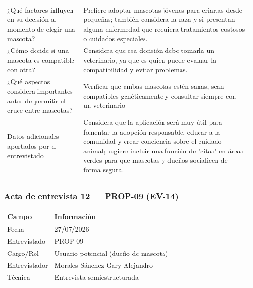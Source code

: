 \documentclass[journal,onecolumn]{IEEEtran}
\begin{document}
{\begin{longtable}{@{}p{5.6cm} p{9.4cm}@{}}
			¿Qué factores influyen en su decisión al momento de elegir una mascota? & Prefiere adoptar mascotas jóvenes para criarlas desde pequeñas; también considera la raza y si presentan alguna enfermedad que requiera tratamientos costosos o cuidados especiales. \\ \addlinespace
			
			¿Cómo decide si una mascota es compatible con otra? & Considera que esa decisión debe tomarla un veterinario, ya que es quien puede evaluar la compatibilidad y evitar problemas. \\ \addlinespace
			
			¿Qué aspectos considera importantes antes de permitir el cruce entre mascotas? & Verificar que ambas mascotas estén sanas, sean compatibles genéticamente y consultar siempre con un veterinario. \\ \addlinespace
			
			Datos adicionales aportados por el entrevistado & Considera que la aplicación será muy útil para fomentar la adopción responsable, educar a la comunidad y crear conciencia sobre el cuidado animal; sugiere incluir una función de "citas" en áreas verdes para que mascotas y dueños socialicen de forma segura. \\ \addlinespace
			
		\end{longtable}
	}
	
	
	\subsubsection*{Acta de entrevista 12 --- PROP-09 (EV-14)}
	
	\begin{table}[H]
		\centering\small
		\begin{tabularx}{\textwidth}{@{}l X@{}}
			\toprule
			\textbf{Campo} & \textbf{Información} \\
			\midrule
			
			Fecha & 27/07/2026 \\
			
			Entrevistado & PROP-09 \\
			
			Cargo/Rol & Usuario potencial (dueño de mascota) \\
			
			Entrevistador & Morales Sánchez Gary Alejandro \\
			
			Técnica & Entrevista semiestructurada \\
			
			\bottomrule
		\end{tabularx}
	\end{table}
	
\end{document}
